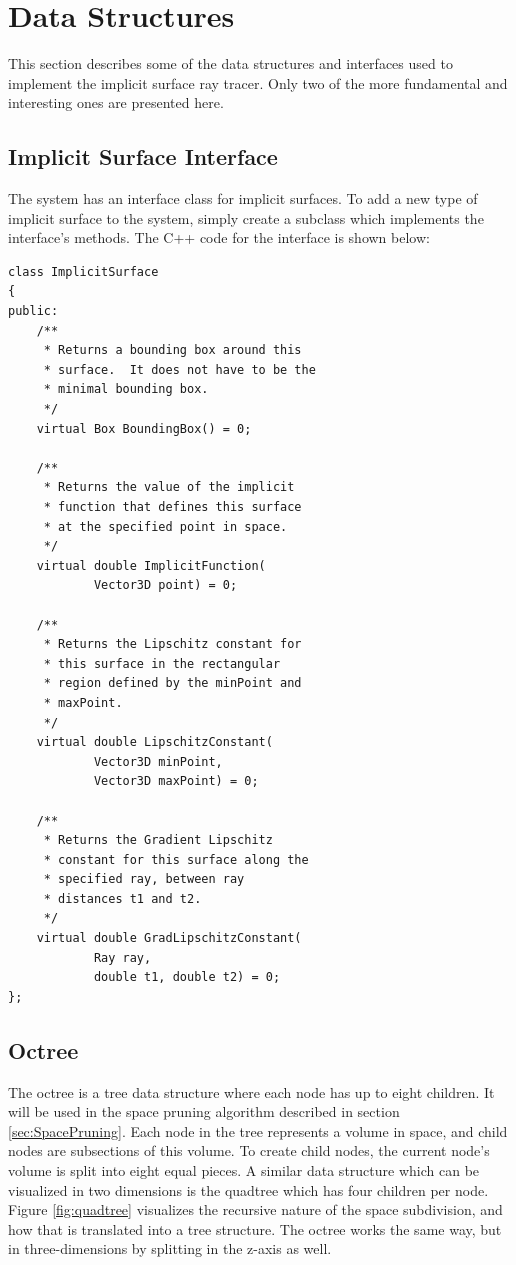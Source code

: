 \documentclass[conference]{acmsiggraph}
\begin{document}
\section{Data Structures}

This section describes some of the data structures and interfaces 
used to implement the implicit surface ray tracer.  Only two of the 
more fundamental and interesting ones are presented here.

\subsection{Implicit Surface Interface}

The system has an interface class for implicit surfaces.  To add a new
type of implicit surface to the system, simply create a subclass
which implements the interface's methods.  The C++ code for the interface
is shown below:

\begin{verbatim}
class ImplicitSurface
{
public:
    /**
     * Returns a bounding box around this 
     * surface.  It does not have to be the 
     * minimal bounding box.
     */
    virtual Box BoundingBox() = 0;
    
    /**
     * Returns the value of the implicit 
     * function that defines this surface
     * at the specified point in space.
     */
    virtual double ImplicitFunction(
            Vector3D point) = 0;
    
    /**
     * Returns the Lipschitz constant for 
     * this surface in the rectangular
     * region defined by the minPoint and 
     * maxPoint.
     */
    virtual double LipschitzConstant(
            Vector3D minPoint, 
            Vector3D maxPoint) = 0;

    /**
     * Returns the Gradient Lipschitz 
     * constant for this surface along the
     * specified ray, between ray 
     * distances t1 and t2.
     */
    virtual double GradLipschitzConstant(
            Ray ray, 
            double t1, double t2) = 0;
};
\end{verbatim}

\subsection{Octree}

The octree is a tree data structure where each node has up to eight 
children.  It will be used in the space pruning algorithm described in
section \ref{sec:SpacePruning}.  Each node in the tree represents a volume
in space, and child nodes are subsections of this volume.  To create
child nodes, the current node's volume is split into eight equal pieces.
A similar data structure which can be visualized in two dimensions is
the quadtree which has four children per node.  Figure \ref{fig:quadtree}
visualizes the recursive nature of the space subdivision, and how that is translated
into a tree structure. 
The octree works the same way, but in three-dimensions by splitting in
the z-axis as well.
\end{document}
